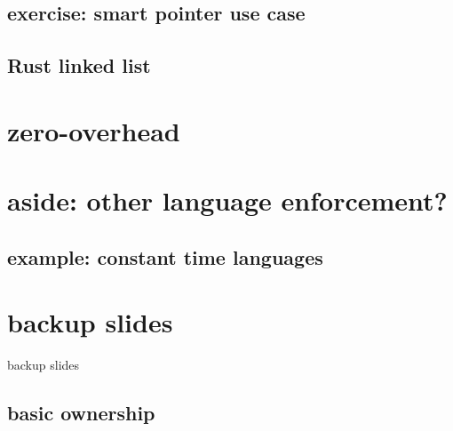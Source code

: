 \subsection{exercise: smart pointer use case}


\subsection{Rust linked list}


\section{zero-overhead}


\section{aside: other language enforcement?}


\subsection{example: constant time languages}




\section{backup slides}
\begin{frame}{backup slides}
\end{frame}
\subsection{basic ownership}



